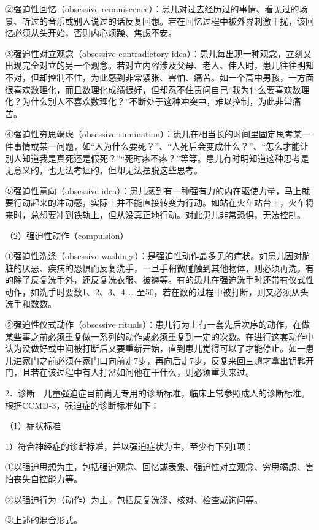 ②强迫性回忆（obsessive
reminiscence）：患儿对过去经历过的事情、看见过的场景、听过的音乐或别人说过的话反复回想。若在回忆过程中被外界刺激干扰，该回忆必须从头开始，否则内心烦躁、焦虑不安。

③强迫性对立观念（obsessive contradictory
idea）：患儿每出现一种观念，立刻又出现完全对立的另一个观念。若对立内容涉及父母、老人、伟人时，患儿往往明知不对，但却控制不住，为此感到非常紧张、害怕、痛苦。如一个高中男孩，一方面很喜欢数理化，而且数理化成绩很好，但却忍不住责问自己“我为什么要喜欢数理化？为什么别人不喜欢数理化？”不断处于这种冲突中，难以控制，为此非常痛苦。

④强迫性穷思竭虑（obsessive
rumination）：患儿在相当长的时间里固定思考某一件事情或某一问题，如“人为什么要死？”、“人死后会变成什么？”、“怎么才能让别人知道我是真死还是假死？”“死时疼不疼？”等等。患儿有时明知道这种思考是无意义的，也无法考证的，但却无法摆脱这些思考。

⑤强迫性意向（obsessive
idea）：患儿感到有一种强有力的内在驱使力量，马上就要行动起来的冲动感，实际上并不能直接转变为行动。如站在火车站台上，火车将来时，总想要冲到铁轨上，但从没真正地行动。对此患儿非常恐惧，无法控制。

（2）强迫性动作（compulsion）

①强迫性洗涤（obsessive
washings）：是强迫性动作最多见的症状。如患儿因对肮脏的厌恶、疾病的恐惧而反复洗手，一旦手稍微碰触到其他物体，则必须再洗。有的除了反复洗手外，还反复洗衣服、被褥等。有的患儿在强迫洗手时还带有仪式性动作，如洗手时要数1、2、3、4\ldots{}\ldots{}至50，若在数的过程中被打断，则又必须从头洗手和数数。

②强迫性仪式动作（obsessive
rituals）：患儿行为上有一套先后次序的动作，在做某些事之前必须重复做一系列的动作或必须重复到一定的次数。在进行这套动作中认为没做好或中间被打断后又要重新开始，直到患儿觉得可以了才能停止。如一患儿进家门之前必须在家门口向前走7步，再向后走7步，反复来回三趟才拿出钥匙开门，且若在该过程中有人打岔如问他在干什么，则必须重头来过。

2．诊断　儿童强迫症目前尚无专用的诊断标准，临床上常参照成人的诊断标准。根据CCMD-3，强迫症的诊断标准如下：

（1）症状标准

1）符合神经症的诊断标准，并以强迫症状为主，至少有下列1项：

①以强迫思想为主，包括强迫观念、回忆或表象、强迫性对立观念、穷思竭虑、害怕丧失自控能力等。

②以强迫行为（动作）为主，包括反复洗涤、核对、检查或询问等。

③上述的混合形式。

